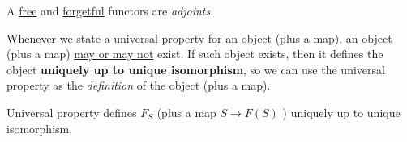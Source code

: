 \begin{definition}\label{def:adjoint-functor}
	A \underline{free} and \underline{forgetful} functors are \emph{adjoints}.
\end{definition}

\begin{remark}
	Whenever we state a universal property for an object (plus a map), an object (plus a map) \underline{may or may not} exist.
	If such object exists, then it defines the object \textbf{uniquely up to unique isomorphism}, so we can use the universal
	property as the \emph{definition} of the object (plus a map).
\end{remark}

\begin{lemma}
	Universal property defines \(F_S\) (plus a map \(S\to F(S)\) ) uniquely up to unique isomorphism.
\end{lemma}
